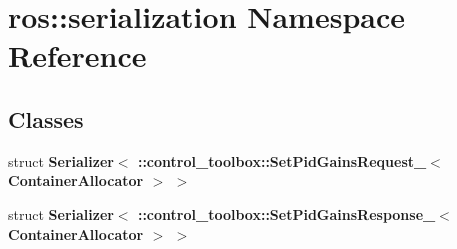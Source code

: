 \section{ros\-:\-:serialization \-Namespace \-Reference}
\label{namespaceros_1_1serialization}
\subsection*{\-Classes}
\begin{DoxyCompactItemize}
\item 
struct {\bf \-Serializer$<$ \-::control\-\_\-toolbox\-::\-Set\-Pid\-Gains\-Request\-\_\-$<$ Container\-Allocator $>$ $>$}
\item 
struct {\bf \-Serializer$<$ \-::control\-\_\-toolbox\-::\-Set\-Pid\-Gains\-Response\-\_\-$<$ Container\-Allocator $>$ $>$}
\end{DoxyCompactItemize}

